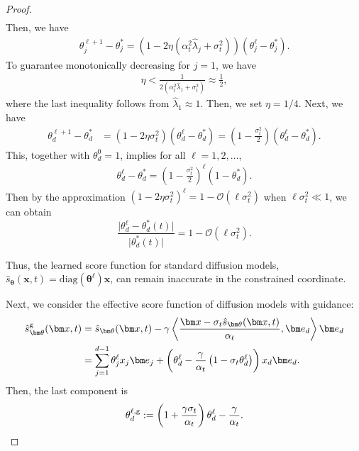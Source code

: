 \documentclass{article}
\theoremstyle{plain}
\theoremstyle{definition}
\theoremstyle{remark}
\begin{document}
\begin{proof}
\begin{align*}
\end{align*}
Then, we have
\begin{align*}
    \theta_j^{\ell+1} - \theta_j^* = \left( 1 - 2\eta\left( \alpha_t^2 \hat{\lambda}_j + \sigma_t^2 \right) \right)\left( \theta_j^{\ell} - \theta_j^* \right).
\end{align*}
To guarantee monotonically decreasing for $j=1$, we have
\begin{align*}
 \eta < \frac{1}{2\left(\alpha_t^2\hat{\lambda}_{1} + \sigma_t^2\right)}  \approx \frac{1}{2},
\end{align*}
where the last inequality follows from $\hat{\lambda}_1 \approx 1$. Then, we set $\eta = 1/4$.  Next, we have
\begin{align*}
     \theta_d^{\ell+1} - \theta_d^* & = \left( 1 - 2\eta \sigma_t^2 \right)\left( \theta_d^{\ell} - \theta_d^* \right)
      = \left( 1 - \frac{\sigma_t^2 }{2} \right)\left( \theta_d^{\ell} - \theta_d^* \right).
\end{align*}
This, together with $\theta_d^0 = 1$, implies for all $\ell=1,2,\dots$,
\begin{align*}
     \theta_d^{\ell} - \theta_d^*  = \left( 1 - \frac{\sigma_t^2 }{2}\right)^{\ell} \left(1 - \theta_d^*\right).
\end{align*}
Then by the approximation \((1-2\eta\sigma_t^2)^\ell = 1 - \mathcal{O}(\ell\sigma_t^2)\) when \(\ell\sigma_t^2\ll 1\), we can obtain
\[
\frac{\lvert \theta_d^{\ell} - \theta_d^*(t)\rvert}{\lvert \theta_d^*(t)\rvert}
= 1 - \mathcal{O}(\ell\sigma_t^2).
\]

Thus, the learned score function for standard diffusion models, $\hat{s}_{\bm \theta}(\bm x,t) =  \mathrm{diag}(\bm \theta^\ell)\bm x$, can remain inaccurate in the constrained coordinate.

Next, we consider the effective score function of diffusion models with guidance:
\begin{align*}
     \hat{s}^{\rm g}_{\bm \theta}(\bm x,t) & = \hat{s}_{\bm \theta}(\bm x, t) - \gamma \left\langle \frac{\bm x - \sigma_t \hat{s}_{\bm \theta}(\bm x, t)}{\alpha_t}, \bm e_d\right\rangle  \bm e_d \\
     & = \sum_{j=1}^{d-1} \theta_j^\ell x_j \bm e_j +
\left(\theta_d^\ell-\frac{\gamma}{\alpha_t}\left(1 - \sigma_t \theta_d^\ell\right)
\right) x_d \bm e_d.
\end{align*}
Then, the last component is
\begin{align*}
   \theta^{\ell,{\rm g}}_{d} := \left( 1 + \frac{\gamma \sigma_t}{\alpha_t} \right)\theta^\ell_{d} - \frac{\gamma}{\alpha_t}.
\end{align*}
\end{proof}
\end{document}

